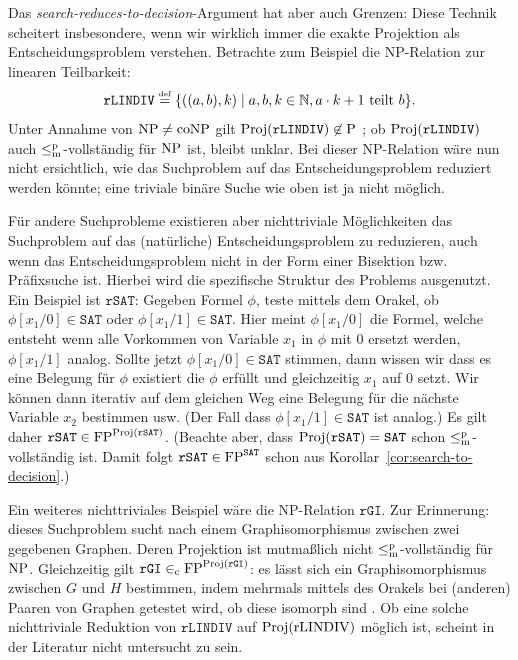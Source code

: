 Das \emph{search-reduces-to-decision}-Argument hat aber auch Grenzen:
Diese Technik scheitert insbesondere, wenn wir wirklich immer die exakte Projektion als Entscheidungsproblem verstehen. Betrachte zum Beispiel die NP-Relation zur linearen Teilbarkeit:
\[ \mathtt{rLINDIV} \stackrel{\text{{\normalfont\tiny def}}}{=} \{ ((a, b), k) \mid a,b,k\in\mathbb N, a\cdot k + 1\text{ teilt } b\}. \]
Unter Annahme von $\mathrm{NP}\neq\mathrm{coNP}$ gilt  $\operatorname{Proj}(\mathtt{rLINDIV})\not\in \mathrm{P}$  \parencite{adleman_reducibility_1977}; ob $\operatorname{Proj}(\mathtt{rLINDIV})$ auch $\leq_\mathrm{m}^\mathrm{p}$-vollständig für $\mathrm{NP}$ ist, bleibt unklar.
Bei dieser NP-Relation wäre nun nicht ersichtlich, wie das Suchproblem auf das Entscheidungsproblem reduziert werden könnte; eine triviale binäre Suche wie oben ist ja nicht möglich.

Für andere Suchprobleme existieren aber nichttriviale Möglichkeiten  das Suchproblem auf das (natürliche) Entscheidungsproblem zu reduzieren, auch wenn das Entscheidungsproblem nicht in der Form einer Bisektion bzw. Präfixsuche ist. Hierbei wird die spezifische Struktur des Problems ausgenutzt. Ein Beispiel ist $\mathtt{rSAT}$: Gegeben Formel $\phi$, teste mittels dem Orakel, ob $\phi[x_1/0]\in\mathtt{SAT}$ oder $\phi[x_1/1]\in\mathtt{SAT}$. Hier meint $\phi[x_1/0]$ die Formel, welche entsteht wenn alle Vorkommen von Variable $x_1$ in $\phi$ mit $0$ ersetzt werden, $\phi[x_1/1]$ analog. Sollte jetzt $\phi[x_1/0]\in\mathtt{SAT}$ stimmen, dann wissen wir dass es eine Belegung für $\phi$ existiert die $\phi$ erfüllt und gleichzeitig $x_1$ auf $0$ setzt. Wir können dann iterativ auf dem gleichen Weg eine Belegung für die nächste Variable $x_2$ bestimmen usw. (Der Fall dass $\phi[x_1/1]\in\mathtt{SAT}$ ist analog.) Es gilt daher $\mathtt{rSAT}\in\mathrm{FP}^{\operatorname{Proj}(\mathtt{rSAT})}$.
(Beachte aber, dass $\operatorname{Proj}(\mathtt{rSAT})=\mathtt{SAT}$ schon $\leq_\mathrm{m}^\mathrm{p}$-vollständig ist. Damit folgt $\mathtt{rSAT}\in \mathrm{FP}^{\mathtt{SAT}}$ schon aus Korollar~\ref{cor:search-to-decision}.)

Ein weiteres nichttriviales Beispiel wäre die NP-Relation $\mathtt{rGI}$. Zur Erinnerung: dieses Suchproblem sucht nach einem Graphisomorphismus zwischen zwei gegebenen Graphen.
Deren Projektion ist mutmaßlich nicht $\leq_\mathrm{m}^\mathrm{p}$-vollständig für $\mathrm{NP}$. 
Gleichzeitig gilt $\mathtt{rGI}\in_\mathrm{c} \mathrm{FP}^{\operatorname{Proj}(\mathtt{rGI})}$: es lässt sich ein Graphisomorphismus zwischen $G$ und $H$ bestimmen, indem mehrmals mittels des Orakels bei (anderen) Paaren von  Graphen getestet wird, ob diese isomorph sind \parencite[vgl.][S. 65, 100]{goldreich_computational_2008}.
Ob eine solche nichttriviale Reduktion von $\mathtt{rLINDIV}$ auf $\operatorname{Proj}(\mathrm{rLINDIV})$ möglich ist, scheint in der Literatur nicht untersucht zu sein.

